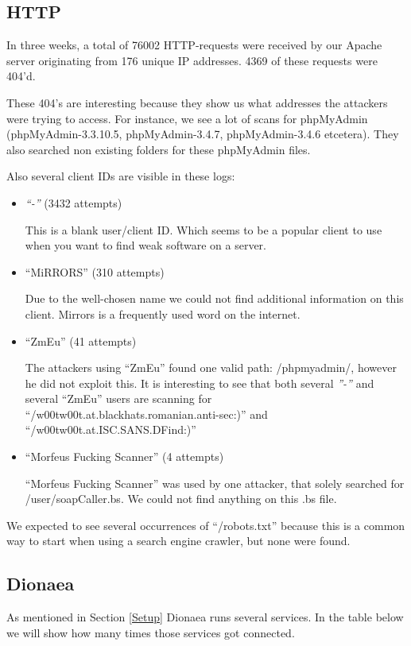 \documentclass[11pt]{article}
\begin{document}
\subsection{HTTP}
In three weeks, a total of 76002 HTTP-requests were received by our Apache server originating from 176 unique IP addresses. 4369 of these requests were 404'd.

These 404's are interesting because they show us what addresses the attackers were trying to access. For instance, we see a lot of scans for phpMyAdmin (phpMyAdmin-3.3.10.5, phpMyAdmin-3.4.7, phpMyAdmin-3.4.6 etcetera). They also searched non existing folders for these phpMyAdmin files. 

Also several client IDs are visible in these logs: 

\begin{itemize}
\item \emph{``-''} (3432 attempts)

This is a blank user/client ID. Which seems to be a popular client to use when you want to find weak software on a server.

\item ``MiRRORS'' (310 attempts)

Due to the well-chosen name we could not find additional information on this client. Mirrors is a frequently used word on the internet.

\item ``ZmEu'' (41 attempts)

The attackers using ``ZmEu'' found one valid path: /phpmyadmin/, however he did not exploit this. 
It is interesting to see that both several \emph{''-''} and several ``ZmEu'' users are scanning for ``/w00tw00t.at.blackhats.romanian.anti-sec:)'' and ``/w00tw00t.at.ISC.SANS.DFind:)''

\item ``Morfeus Fucking Scanner'' (4 attempts)

``Morfeus Fucking Scanner'' was used by one attacker, that solely searched for /user/soapCaller.bs. We could not find anything on this .bs file.
\end{itemize}

We expected to see several occurrences of ``/robots.txt'' because this is a common way to start when using a search engine crawler, but none were found.

\subsection{Dionaea}
As mentioned in Section \ref{Setup} Dionaea runs several services. In the table below we will show how many times those services got connected.
\end{document}
